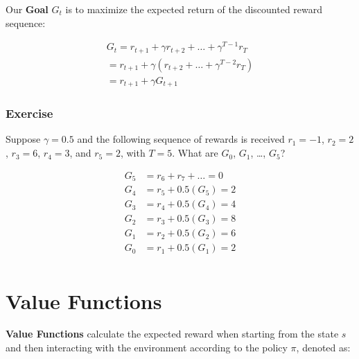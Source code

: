 \documentclass[
  letterpaper,
  DIV=11,
  numbers=noendperiod]{scrreprt}
\begin{document}
Our \textbf{Goal} \(G_{t}\) is to maximize the expected return of the
discounted reward sequence:

\[
\begin{aligned}
G_{t} = r_{t+1} + \gamma r_{t+2} + \ldots + \gamma^{T-1} r_{T} \\
     = r_{t+1} + \gamma (r_{t+2} + \ldots + \gamma^{T-2} r_{T}) \\
     = r_{t+1} + \gamma G_{t+1} 
\end{aligned}
\]

\subsubsection{Exercise}\label{exercise-8}

Suppose \(\gamma = 0.5\) and the following sequence of rewards is
received \(r_{1} = -1\), \(r_{2} = 2\), \(r_{3} = 6\), \(r_{4} = 3\),
and \(r_{5} = 2\), with \(T = 5\). What are \(G_{0}\), \(G_{1}\),
\ldots, \(G_{5}\)?

\begin{tcolorbox}[enhanced jigsaw, opacityback=0, left=2mm, breakable, bottomtitle=1mm, rightrule=.15mm, colframe=quarto-callout-tip-color-frame, titlerule=0mm, colback=white, opacitybacktitle=0.6, toptitle=1mm, title=\textcolor{quarto-callout-tip-color}{\faLightbulb}\hspace{0.5em}{Solution}, colbacktitle=quarto-callout-tip-color!10!white, bottomrule=.15mm, arc=.35mm, coltitle=black, leftrule=.75mm, toprule=.15mm]

\[
\begin{aligned}
G_{5} &= r_{6} + r_{7} + \dots = 0 \\
G_{4} &= r_{5} + 0.5(G_{5}) = 2 \\
G_{3} &= r_{4} + 0.5(G_{4}) = 4 \\
G_{2} &= r_{3} + 0.5(G_{3}) = 8 \\
G_{1} &= r_{2} + 0.5(G_{2}) = 6 \\
G_{0} &= r_{1} + 0.5(G_{1}) = 2 \\
\end{aligned}
\]

\end{tcolorbox}

\section{Value Functions}\label{value-functions}

\textbf{Value Functions} calculate the expected reward when starting
from the state \(s\) and then interacting with the environment according
to the policy \(\pi\), denoted as:
\end{document}
